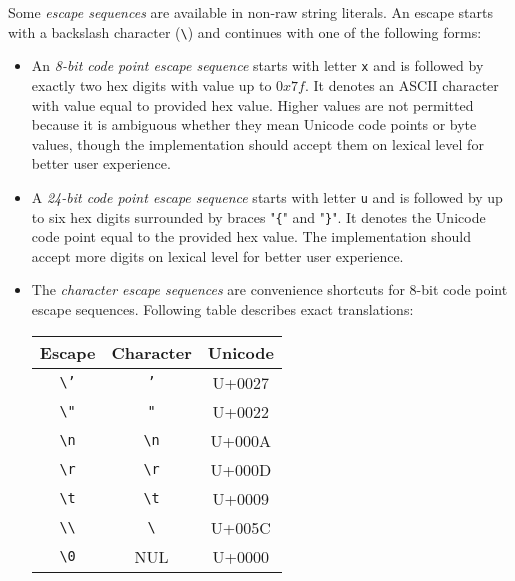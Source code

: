 Some \emph{escape sequences} are available in non-raw string literals. An escape starts with a backslash character (\texttt{\textbackslash}) and continues with one of the following forms:

\begin{itemize}
  \item An \emph{8-bit code point escape sequence} starts with letter \texttt{x} and is followed by exactly two hex digits with value up to \(0x7f\). It denotes an ASCII character with value equal to provided hex value. Higher values are not permitted because it is ambiguous whether they mean Unicode code points or byte values, though the implementation should accept them on lexical level for better user experience.
  \item A \emph{24-bit code point escape sequence} starts with letter \texttt{u} and is followed by up to six hex digits surrounded by braces "\texttt{\{}" and "\texttt{\}}". It denotes the Unicode code point equal to the provided hex value. The implementation should accept more digits on lexical level for better user experience.
  \item The \emph{character escape sequences} are convenience shortcuts for 8-bit code point escape sequences. Following table describes exact translations:

    \begin{center}
    \begin{tabular}{c|c|c}
      Escape & Character & Unicode \\
      \hline
      \texttt{\textbackslash '} & \texttt{'} & U+0027 \\
      \texttt{\textbackslash "} & \texttt{"} & U+0022 \\
      \texttt{\textbackslash n} & \texttt{\textbackslash n} & U+000A \\
      \texttt{\textbackslash r} & \texttt{\textbackslash r} & U+000D \\
      \texttt{\textbackslash t} & \texttt{\textbackslash t} & U+0009 \\
      \texttt{\textbackslash \textbackslash} & \texttt{\textbackslash} & U+005C \\
      \texttt{\textbackslash 0} & NUL & U+0000 \\
    \end{tabular}
    \end{center}
\end{itemize}

